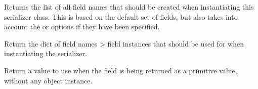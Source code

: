 \documentclass[letterpaper,10pt,english]{sphinxmanual}
\begin{document}
\begin{fulllineitems}
\begin{fulllineitems}
\end{fulllineitems}


\begin{fulllineitems}
\label{\detokenize{tasks:tasks.serializers.TaskSerializer.get_field_names}}
\pysigstartsignatures
{}
\pysigstopsignatures
\sphinxAtStartPar
Returns the list of all field names that should be created when
instantiating this serializer class. This is based on the default
set of fields, but also takes into account the  or
 options if they have been specified.

\end{fulllineitems}


\begin{fulllineitems}
\label{\detokenize{tasks:tasks.serializers.TaskSerializer.get_fields}}
\pysigstartsignatures
{}
\pysigstopsignatures
\sphinxAtStartPar
Return the dict of field names \sphinxhyphen{}\textgreater{} field instances that should be
used for  when instantiating the serializer.

\end{fulllineitems}


\begin{fulllineitems}
\label{\detokenize{tasks:tasks.serializers.TaskSerializer.get_initial}}
\pysigstartsignatures
{}
\pysigstopsignatures
\sphinxAtStartPar
Return a value to use when the field is being returned as a primitive
value, without any object instance.

\end{fulllineitems}



\end{fulllineitems}
\end{document}
